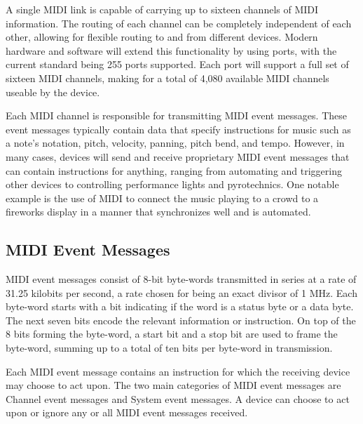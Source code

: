 \documentclass[a4paper,12pt]{report}
\begin{document}
A single MIDI link is capable of carrying up to sixteen channels of MIDI information. The routing of each channel can be completely independent of each other, allowing for flexible routing to and from different devices. Modern hardware and software will extend this functionality by using ports, with the current standard being 255 ports supported. Each port will support a full set of sixteen MIDI channels, making for a total of 4,080 available MIDI channels useable by the device.

Each MIDI channel is responsible for transmitting MIDI event messages. These event messages typically contain data that specify instructions for music such as a note's notation, pitch, velocity, panning, pitch bend, and tempo. However, in many cases, devices will send and receive proprietary MIDI event messages that can contain instructions for anything, ranging from automating and triggering other devices to controlling performance lights and pyrotechnics. One notable example is the use of MIDI to connect the music playing to a crowd to a fireworks display in a manner that synchronizes well and is automated.

\subsection{MIDI Event Messages}
\label{subsec:midieventmsg}

MIDI event messages consist of 8-bit byte-words transmitted in series at a rate of 31.25 kilobits per second, a rate chosen for being an exact divisor of 1 MHz. Each byte-word starts with a bit indicating if the word is a status byte or a data byte. The next seven bits encode the relevant information or instruction. On top of the 8 bits forming the byte-word, a start bit and a stop bit are used to frame the byte-word, summing up to a total of ten bits per byte-word in transmission.

Each MIDI event message contains an instruction for which the receiving device may choose to act upon. The two main categories of MIDI event messages are Channel event messages and System event messages. A device can choose to act upon or ignore any or all MIDI event messages received.
\end{document}
